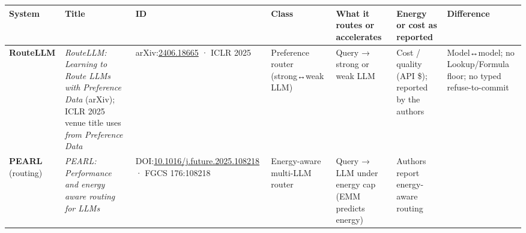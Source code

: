 \documentclass[
  10pt,
]{article}
\newcounter{none} %
\begin{document}
{\def\LTcaptype{none} %
\begin{longtable}[]{@{}
  >{\raggedright\arraybackslash}p{}
  >{\raggedright\arraybackslash}p{}
  >{\raggedright\arraybackslash}p{}
  >{\raggedright\arraybackslash}p{}
  >{\raggedright\arraybackslash}p{}
  >{\raggedright\arraybackslash}p{}
  >{\raggedright\arraybackslash}p{}@{}}
\toprule\noalign{}
\begin{minipage}[b]{\linewidth}\raggedright
System
\end{minipage} & \begin{minipage}[b]{\linewidth}\raggedright
Title
\end{minipage} & \begin{minipage}[b]{\linewidth}\raggedright
ID
\end{minipage} & \begin{minipage}[b]{\linewidth}\raggedright
Class
\end{minipage} & \begin{minipage}[b]{\linewidth}\raggedright
What it routes or accelerates
\end{minipage} & \begin{minipage}[b]{\linewidth}\raggedright
Energy or cost as reported
\end{minipage} & \begin{minipage}[b]{\linewidth}\raggedright
Difference
\end{minipage} \\
\midrule\noalign{}
\endhead
\bottomrule\noalign{}
\endlastfoot
\textbf{RouteLLM} & \emph{RouteLLM: Learning to Route LLMs with
Preference Data} (arXiv); ICLR 2025 venue title uses \emph{from
Preference Data} &
arXiv:\href{https://arxiv.org/abs/2406.18665}{2406.18665} · ICLR 2025 &
Preference router (strong↔weak LLM) & Query → strong or weak LLM & Cost
/ quality (API \$); reported by the authors & Model↔model; no
Lookup/Formula floor; no typed refuse-to-commit \\
\textbf{PEARL} (routing) & \emph{PEARL: Performance and energy aware
routing for LLMs} &
DOI:\href{https://doi.org/10.1016/j.future.2025.108218}{10.1016/j.future.2025.108218}
· FGCS 176:108218 & Energy-aware multi-LLM router & Query → LLM under
energy cap (EMM predicts energy) & Authors report energy-aware routing

\end{longtable}}
\end{document}
